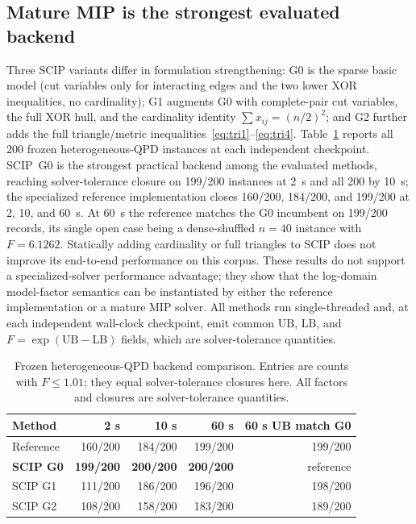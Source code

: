 \documentclass[
  aps,
  pra,
  reprint,
  amsmath,
  amssymb,
  longbibliography,
  nofootinbib,
  floatfix
]{revtex4-2}
\theoremstyle{plain}
\newcommand{\LB}{\mathrm{LB}}
\newcommand{\UB}{\mathrm{UB}}
\newcommand{\tabfit}[1]{{\footnotesize #1}}
\begin{document}
\subsection{Mature MIP is the strongest evaluated backend}

Three SCIP variants differ in formulation strengthening: G0 is the sparse basic model (cut variables only for interacting edges and the two lower XOR inequalities, no cardinality); G1 augments G0 with complete-pair cut variables, the full XOR hull, and the cardinality identity $\sum x_{ij}=(n/2)^2$; and G2 further adds the full triangle/metric inequalities~\eqref{eq:tri1}--\eqref{eq:tri4}. Table~\ref{tab:e7-backends} reports all 200 frozen heterogeneous-QPD instances at each independent checkpoint. SCIP~G0 is the strongest practical backend among the evaluated methods, reaching solver-tolerance closure on 199/200 instances at 2~s and all 200 by 10~s; the specialized reference implementation closes 160/200, 184/200, and 199/200 at 2, 10, and 60~s. At 60~s the reference matches the G0 incumbent on 199/200 records, its single open case being a dense-shuffled $n=40$ instance with $F=6.1262$. Statically adding cardinality or full triangles to SCIP does not improve its end-to-end performance on this corpus. These results do not support a specialized-solver performance advantage; they show that the log-domain model-factor semantics can be instantiated by either the reference implementation or a mature MIP solver. All methods run single-threaded and, at each independent wall-clock checkpoint, emit common $\UB$, $\LB$, and $F=\exp(\UB-\LB)$ fields, which are solver-tolerance quantities.

\begin{table}[t]
\centering
\caption{Frozen heterogeneous-QPD backend comparison. Entries are counts with $F\leq1.01$; they equal solver-tolerance closures here. All factors and closures are solver-tolerance quantities.}
\label{tab:e7-backends}
\tabfit{%
\begin{tabular}{lrrrr}
\toprule
\textbf{Method} & \textbf{2 s} & \textbf{10 s} & \textbf{60 s} & \textbf{60 s UB match G0}\\
\midrule
Reference & 160/200 & 184/200 & 199/200 & 199/200\\
\textbf{SCIP G0} & \textbf{199/200} & \textbf{200/200} & \textbf{200/200} & reference\\
SCIP G1 & 111/200 & 186/200 & 196/200 & 198/200\\
SCIP G2 & 108/200 & 158/200 & 183/200 & 189/200\\
\bottomrule
\end{tabular}
}
\end{table}
\end{document}
